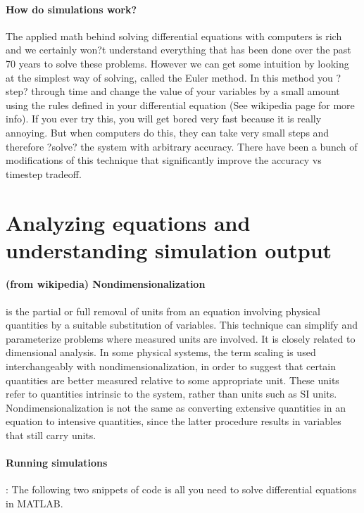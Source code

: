 \paragraph{How do simulations work?} The applied math behind solving differential equations with computers is rich and we certainly won?t understand everything that has been done over the past 70 years to solve these problems.  However we can get some intuition by looking at the simplest way of solving, called the Euler method.  In this method you ?step? through time and change the value of your variables by a small amount using the rules defined in your differential equation (See wikipedia page for more info).  If you ever try this, you will get bored very fast because it is really annoying.  But when computers do this, they can take very small steps and therefore ?solve? the system with arbitrary accuracy.  There have been a bunch of modifications of this technique that significantly improve the accuracy vs timestep tradeoff.






\section{Analyzing equations and understanding simulation output}

\paragraph{(from wikipedia) Nondimensionalization} is the partial or full removal of units from an equation involving physical quantities by a suitable substitution of variables. This technique can simplify and parameterize problems where measured units are involved. It is closely related to dimensional analysis. In some physical systems, the term scaling is used interchangeably with nondimensionalization, in order to suggest that certain quantities are better measured relative to some appropriate unit. These units refer to quantities intrinsic to the system, rather than units such as SI units. Nondimensionalization is not the same as converting extensive quantities in an equation to intensive quantities, since the latter procedure results in variables that still carry units.

\paragraph{Running simulations}: The following two snippets of code is all you need to solve differential equations in MATLAB.


